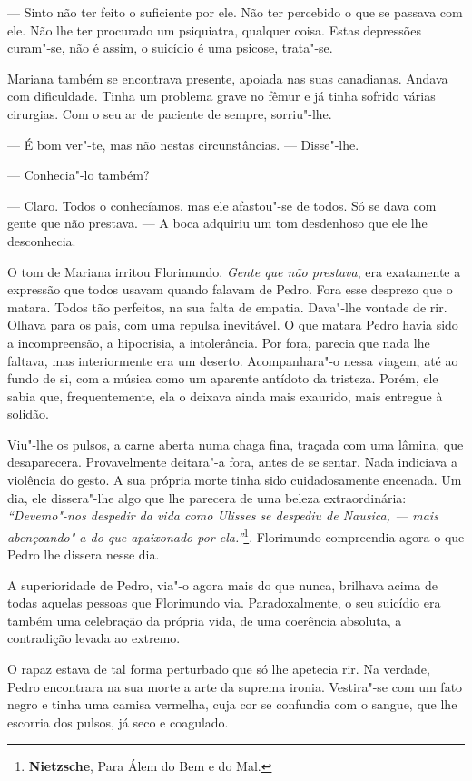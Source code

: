 --- Sinto não ter feito o suficiente por ele. Não ter percebido o que se
passava com ele. Não lhe ter procurado um psiquiatra, qualquer coisa.
Estas depressões curam"-se, não é assim, o suicídio é uma psicose,
trata"-se.

Mariana também se encontrava presente, apoiada nas suas canadianas.
Andava com dificuldade. Tinha um problema grave no fêmur e já tinha
sofrido várias cirurgias. Com o seu ar de paciente de sempre,
sorriu"-lhe.

--- É bom ver"-te, mas não nestas circunstâncias. --- Disse"-lhe.

--- Conhecia"-lo também?

--- Claro. Todos o conhecíamos, mas ele afastou"-se de todos. Só se dava
com gente que não prestava. --- A boca adquiriu um tom desdenhoso que ele
lhe desconhecia.

O tom de Mariana irritou Florimundo. \emph{Gente que não prestava}, era
exatamente a expressão que todos usavam quando falavam de Pedro. Fora
esse desprezo que o matara. Todos tão perfeitos, na sua falta de
empatia. Dava"-lhe vontade de rir. Olhava para os pais, com uma repulsa
inevitável. O que matara Pedro havia sido a incompreensão, a hipocrisia,
a intolerância. Por fora, parecia que nada lhe faltava, mas
interiormente era um deserto. Acompanhara"-o nessa viagem, até ao fundo
de si, com a música como um aparente antídoto da tristeza. Porém, ele
sabia que, frequentemente, ela o deixava ainda mais exaurido, mais
entregue à solidão.

Viu"-lhe os pulsos, a carne aberta numa chaga fina, traçada com uma
lâmina, que desaparecera. Provavelmente deitara"-a fora, antes de se
sentar. Nada indiciava a violência do gesto. A sua própria morte tinha
sido cuidadosamente encenada. Um dia, ele dissera"-lhe algo que lhe
parecera de uma beleza extraordinária: \emph{``Devemo"-nos despedir da
vida como Ulisses se despediu de Nausica, --- mais abençoando"-a do que
apaixonado por ela.''}\footnote{\textbf{Nietzsche}, Para
  Álem do Bem e do Mal.}. Florimundo compreendia agora o que
Pedro lhe dissera nesse dia.

A superioridade de Pedro, via"-o agora mais do que nunca, brilhava acima
de todas aquelas pessoas que Florimundo via. Paradoxalmente, o seu
suicídio era também uma celebração da própria vida, de uma coerência
absoluta, a contradição levada ao extremo.

O rapaz estava de tal forma perturbado que só lhe apetecia rir. Na
verdade, Pedro encontrara na sua morte a arte da suprema ironia.
Vestira"-se com um fato negro e tinha uma camisa vermelha, cuja cor se
confundia com o sangue, que lhe escorria dos pulsos, já seco e
coagulado.

